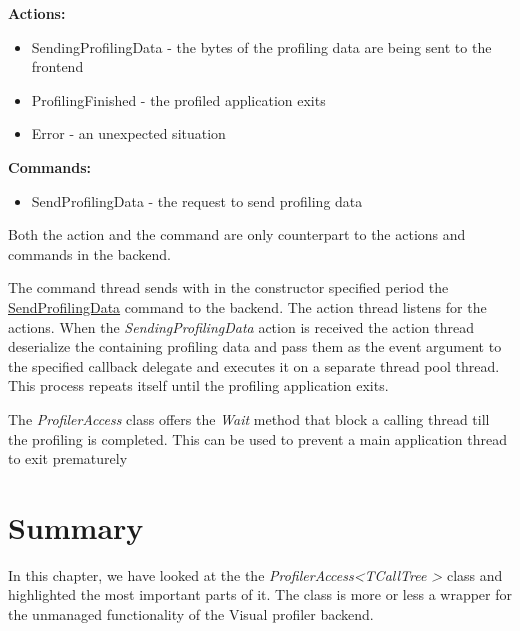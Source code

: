 \textbf{Actions:}
\begin{itemize}	
\item	SendingProfilingData - the bytes of the profiling data are being sent to the frontend
\item	ProfilingFinished - the profiled application exits
\item   Error - an unexpected situation
\end{itemize}

\textbf{Commands:}
\begin{itemize}	
\item	SendProfilingData - the request to send profiling data
\end{itemize}

Both the action and the command are only counterpart to the actions and commands in the backend.

The command thread sends with in the constructor specified period the \underline{SendProfilingData} command to the backend. The action thread listens for the actions. When the \textit{SendingProfilingData} action is received the action thread deserialize the containing profiling data and pass them as the event argument to the specified callback delegate and executes it on a separate thread pool thread. This process repeats itself until the profiling application exits.

The \textit{ProfilerAccess} class offers the \textit{Wait} method that block a calling thread till the profiling is completed. This can be used to prevent a main application thread to exit prematurely

\section{Summary}
In this chapter, we have looked at the the \textit{ProfilerAccess\textless TCallTree \textgreater} class and highlighted the most important parts of it. The class is more or less a wrapper for the unmanaged functionality of the Visual profiler backend.